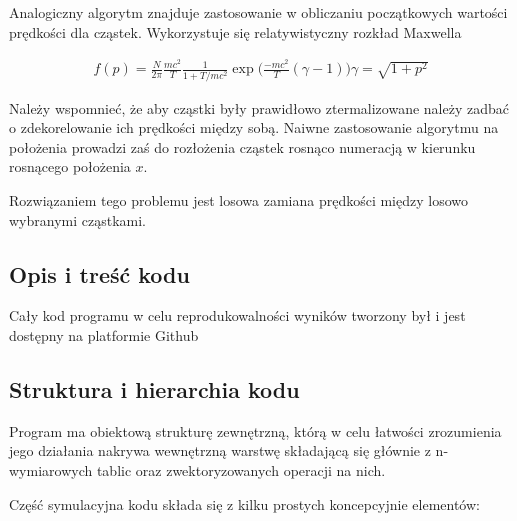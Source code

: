     Analogiczny algorytm znajduje zastosowanie w obliczaniu początkowych
    wartości prędkości dla cząstek.  Wykorzystuje się relatywistyczny rozkład
    Maxwella

    \begin{align}
        f(p) = \frac{N}{2 \pi} \frac{mc^2}{T} \frac{1}{1+T/mc^2} \exp \Big (\frac{-mc^2}{T}(\gamma -1) \Big)
        \gamma = \sqrt{1+p^2}
        \label{relativistic-maxwell-distribution}
    \end{align}

    Należy wspomnieć, że aby cząstki były prawidłowo ztermalizowane
     należy zadbać o zdekorelowanie ich
    prędkości między sobą. Naiwne zastosowanie algorytmu na położenia prowadzi
    zaś do rozłożenia cząstek rosnąco numeracją w kierunku rosnącego położenia
    $x$.

    Rozwiązaniem tego problemu jest losowa zamiana prędkości między losowo
    wybranymi cząstkami.  

    \subsection{Opis i treść kodu}
    Cały kod programu w celu reprodukowalności wyników tworzony był i jest
    dostępny na platformie Github 

    \subsection{Struktura i hierarchia kodu}

    Program ma obiektową strukturę zewnętrzną, którą w celu łatwości
    zrozumienia jego działania nakrywa wewnętrzną warstwę składającą się
    głównie z n-wymiarowych tablic  oraz zwektoryzowanych
    operacji na nich.

    Część symulacyjna kodu składa się z kilku prostych koncepcyjnie elementów:

